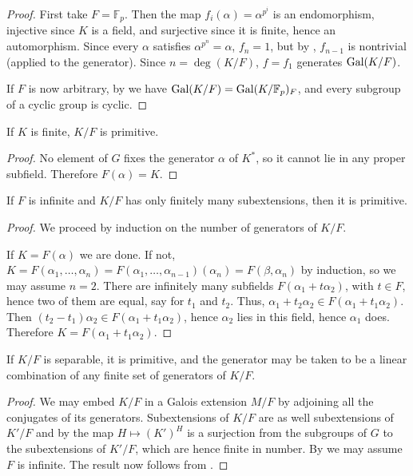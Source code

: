 \begin{proof} First take $F = \mathbb{F}_p$.  Then the map $f_i(\alpha) =
\alpha^{p^i}$ is an endomorphism, injective since $K$ is a field, and
surjective since it is finite, hence an automorphism.  Since every $\alpha$
satisfies $\alpha^{p^n} = \alpha$, $f_n = 1$, but by , $f_{n -
1}$ is nontrivial (applied to the generator).  Since $n = \deg(K/F)$, $f =
f_1$ generates $\operatorname{\text{Gal}}(K/F)$.

If $F$ is now arbitrary, by  we have $\operatorname{\text{Gal}}(K/F) =
\operatorname{\text{Gal}}(K/\mathbb{F}_p)_F$, and every subgroup of a cyclic group is cyclic.
\end{proof}

\begin{corollary} If $K$ is finite, $K/F$ is primitive.
\label{fin_prim_elt}
\end{corollary}

\begin{proof} No element of $G$ fixes the generator $\alpha$ of $K^\ast$, so
it cannot lie in any proper subfield.  Therefore $F(\alpha) = K$. \end{proof}

\begin{proposition} If $F$ is infinite and $K/F$ has only finitely many subextensions, then it is
primitive.
\label{gen_prim_elt}
\end{proposition}

\begin{proof} We proceed by induction on the number of generators of $K/F$.

If $K = F(\alpha)$ we are done.  If not, $K = F(\alpha_1, \dots, \alpha_n) =
F(\alpha_1, \dots, \alpha_{n - 1})(\alpha_n) = F(\beta, \alpha_n)$ by
induction, so we may assume $n = 2$.  There are infinitely many subfields
$F(\alpha_1 + t \alpha_2)$, with $t \in F$, hence two of them are equal, say for $t_1$ and
$t_2$.  Thus, $\alpha_1 + t_2 \alpha_2 \in F(\alpha_1 + t_1 \alpha_2)$.  Then
$(t_2 - t_1)\alpha_2 \in F(\alpha_1 + t_1 \alpha_2)$, hence $\alpha_2$ lies in
this field, hence $\alpha_1$ does.  Therefore $K = F(\alpha_1 + t_1
\alpha_2)$. \end{proof}

\begin{corollary} If $K/F$ is separable, it is primitive, and the generator may be
taken to be a linear combination of any finite set of generators of $K/F$.
\label{prim_elt}
\end{corollary}

\begin{proof} We may embed $K/F$ in a Galois extension $M/F$ by adjoining all
the conjugates of its generators.  Subextensions of $K/F$ are as well subextensions
of $K'/F$ and by  the map $H \mapsto (K')^H$ is a surjection
from the subgroups of $G$ to the subextensions of $K'/F$, which are hence
finite in number.  By  we may assume $F$ is infinite.  The
result now follows from . \end{proof}

